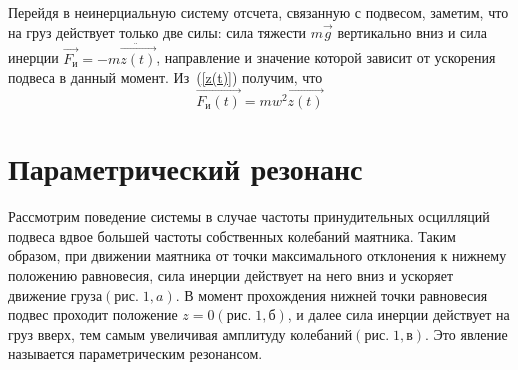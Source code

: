 \documentclass[a4paper,12pt]{article}
\begin{document}
	Перейдя в неинерциальную систему отсчета, связанную с подвесом, заметим, что на груз действует только две силы: сила тяжести $m\overrightarrow{g}$ вертикально вниз и сила инерции $\overrightarrow{F_и} = -m\ddot{\overrightarrow{z(t)}}$, направление и значение которой зависит от ускорения подвеса в данный момент. Из~(\ref{z(t)}) получим, что 
\begin{equation}
\label{Fi}
\overrightarrow{F_и(t)} = mw^2\overrightarrow{z(t)}
\end{equation}

\newpage
\section{Параметрический резонанс}
Рассмотрим поведение системы в случае частоты принудительных осцилляций подвеса вдвое большей частоты собственных колебаний маятника. Таким образом, при движении маятника от точки максимального отклонения к нижнему положению равновесия, сила инерции действует на него вниз и ускоряет движение груза$(рис.\;1,a)$. В момент прохождения нижней точки равновесия подвес проходит положение $z = 0(рис.\; 1,б)$, и далее сила инерции действует на груз вверх, тем самым увеличивая амплитуду колебаний$(рис.\; 1,в)$. Это явление называется параметрическим резонансом.
\end{document}
